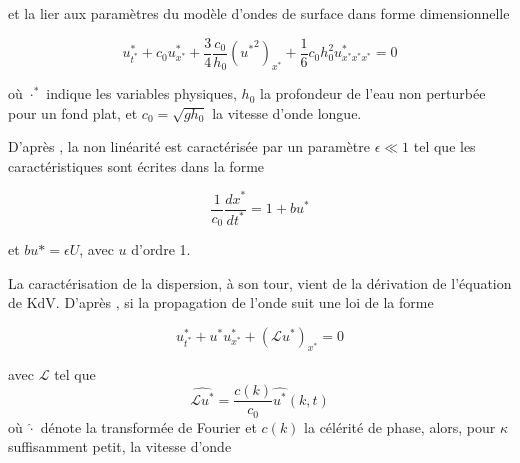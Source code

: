 \noindent et la lier aux paramètres du modèle d'ondes de surface dans forme dimensionnelle \cite{Khorsand2014}

\begin{equation}
\label{eq:physiqueKdV}
    u^*_{t^*} + c_0u^*_{x^*} + \frac{3}{4}\frac{c_0}{h_0}({u^*}^2)_{x^*} + \frac{1}{6}c_0h_0^2u^*_{x^*x^*x^*} = 0 
\end{equation}

\noindent où $\cdot^*$ indique les variables physiques, $h_0$ la profondeur de l'eau non perturbée pour un fond plat, et $c_0 = \sqrt{gh_0}$ la vitesse d'onde longue.

%
%
%
%
%
%
%
%


\indent D'après \cite{BBM1971}, la non linéarité est caractérisée par un paramètre $\epsilon \ll 1$ tel que les caractéristiques sont écrites dans la forme

$$ \frac{1}{c_0} \frac{dx^*}{dt^*} = 1+ bu^*$$

\noindent et $bu*=\epsilon U$, avec $u$ d'ordre 1. 


\indent La caractérisation de la dispersion, à son tour, vient de la dérivation de l'équation de KdV. D'après \cite{BBM1971}, si la propagation de l'onde suit une loi de la forme

$$ u^*_{t^*} + u^*u^*_{x^*}+(\mathcal{L} u^*)_{x^*} = 0$$

\noindent avec $\mathcal{L}$ tel que $$ \widehat{\mathcal{L}u^*} = \frac{c(k)}{c_0} \widehat{u^*}(k,t)$$ où $\hat \cdot$ dénote la transformée de Fourier et  $c(k)$ la célérité  de phase, alors, pour $\kappa$ suffisamment petit, la vitesse d'onde


